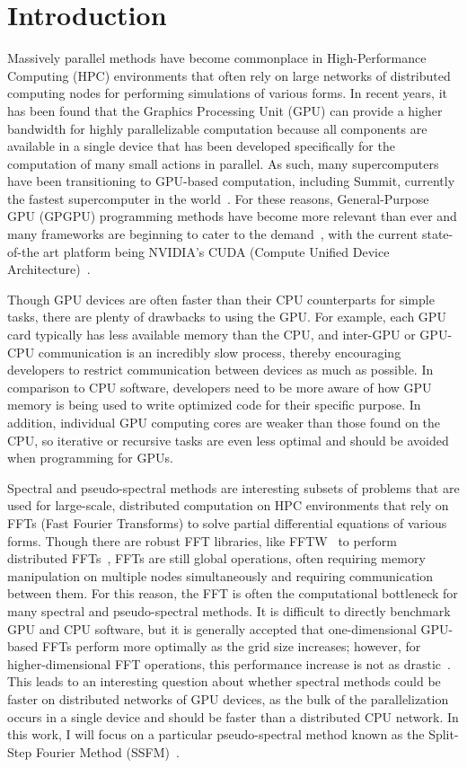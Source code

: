 \section*{Introduction}

Massively parallel methods have become commonplace in High-Performance Computing (HPC) environments that often rely on large networks of distributed computing nodes for performing simulations of various forms.
In recent years, it has been found that the Graphics Processing Unit (GPU) can provide a higher bandwidth for highly parallelizable computation because all components are available in a single device that has been developed specifically for the computation of many small actions in parallel.
As such, many supercomputers have been transitioning to GPU-based computation, including Summit, currently the fastest supercomputer in the world~\cite{kahle2019}.
For these reasons, General-Purpose GPU (GPGPU) programming methods have become more relevant than ever and many frameworks are beginning to cater to the demand~\cite{reyes2012, fatica2008, besard2016, opencl}, with the current state-of-the art platform being NVIDIA's CUDA (Compute Unified Device Architecture)~\cite{CUDAPG}.

Though GPU devices are often faster than their CPU counterparts for simple tasks, there are plenty of drawbacks to using the GPU.
For example, each GPU card typically has less available memory than the CPU, and inter-GPU or GPU-CPU communication is an incredibly slow process, thereby encouraging developers to restrict communication between devices as much as possible.
In comparison to CPU software, developers need to be more aware of how GPU memory is being used to write optimized code for their specific purpose.
In addition, individual GPU computing cores are weaker than those found on the CPU, so iterative or recursive tasks are even less optimal and should be avoided when programming for GPUs.

Spectral and pseudo-spectral methods are interesting subsets of problems that are used for large-scale, distributed computation on HPC environments that rely on FFTs (Fast Fourier Transforms) to solve partial differential equations of various forms.
Though there are robust FFT libraries, like FFTW~\cite{frigo1998} to perform distributed FFTs~\cite{popovici2018}, FFTs are still global operations, often requiring memory manipulation on multiple nodes simultaneously and requiring communication between them.
For this reason, the FFT is often the computational bottleneck for many spectral and pseudo-spectral methods.
It is difficult to directly benchmark GPU and CPU software, but it is generally accepted that one-dimensional GPU-based FFTs perform more optimally as the grid size increases; however, for higher-dimensional FFT operations, this performance increase is not as drastic~\cite{merz2016}.
This leads to an interesting question about whether spectral methods could be faster on distributed networks of GPU devices, as the bulk of the parallelization occurs in a single device and should be faster than a distributed CPU network.
In this work, I will focus on a particular pseudo-spectral method known as the Split-Step Fourier Method (SSFM)~\cite{agrawal2000}.

